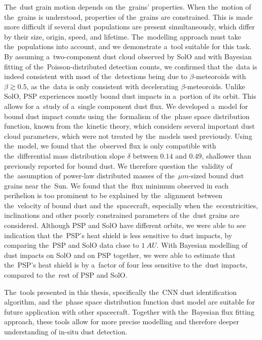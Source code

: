 The~dust grain motion depends on the~grains' properties. When the~motion of the~grains is understood, properties of the~grains are constrained. This is made more difficult if several dust populations are present simultaneously, which differ by their size, origin, speed, and lifetime. The~modelling approach must take the~populations into account, and we demonstrate a~tool suitable for this task. By assuming a~two-component dust cloud observed by SolO and with Bayesian fitting of the~Poisson-distributed detection counts, we confirmed that the~data is indeed consistent with most of the~detections being due to $\beta$-meteoroids with $\beta\gtrsim 0.5$, as the~data is only consistent with decelerating $\beta$-meteoroids. Unlike SolO, PSP experiences mostly bound dust impacts in a~portion of its orbit. This allows for a~study of a~single component dust flux. We developed a~model for bound dust impact counts using the~formalism of the~phase space distribution function, known from the~kinetic theory, which considers several important dust cloud parameters, which were not treated by the~models used previously. Using the~model, we found that the~observed flux is only compatible with the~differential mass distribution slope $\delta$ between $0.14$ and $0.49$, shallower than previously reported for bound dust. We therefore question the~validity of the~assumption of power-law distributed masses of the~$\mu m$-sized bound dust grains near the~Sun. We found that the~flux minimum observed in each perihelion is too prominent to be explained by the~alignment between the~velocity of bound dust and the~spacecraft, especially when the~eccentricities, inclinations and other poorly constrained parameters of the~dust grains are considered. Although PSP and SolO have different orbits, we were able to see indication that the~PSP's heat shield is less sensitive to dust impacts, by comparing the~PSP and SolO data close to $\SI{1}{AU}$. With Bayesian modelling of dust impacts on SolO and on PSP together, we were able to estimate that the~PSP's heat shield is by a~factor of four less sensitive to the~dust impacts, compared to the~rest of PSP and SolO.  

The~tools presented in this thesis, specifically the~CNN dust identification algorithm, and the~phase space distribution function dust model are suitable for future application with other spacecraft. Together with the~Bayesian flux fitting approach, these tools allow for more precise modelling and therefore deeper understanding of in-situ dust detection.  